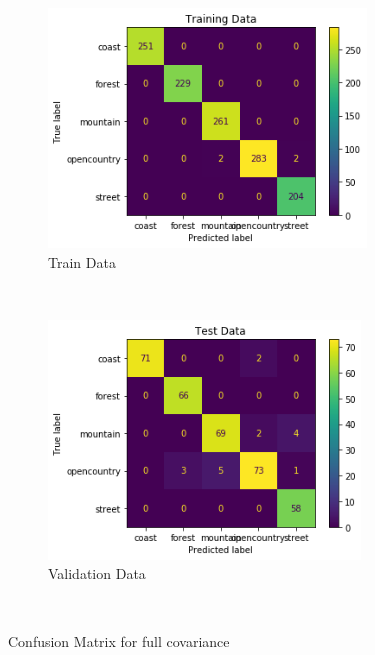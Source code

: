 \begin{figure}[!h]
    \centering
    \begin{subfigure}[t]{0.5\textwidth}
        \centering
        \includegraphics[height=2.5in]{Dataset_2b/full covariance train confusion matrix.png} 
        \caption{Train Data}
    \end{subfigure}%
    ~ 
    \begin{subfigure}[t]{0.5\textwidth}
        \centering
        \includegraphics[height=2.5in]{Dataset_2b/full covariance test confusion matrix.png}
        \caption{Validation Data}
    \end{subfigure}%
    ~
    \caption{Confusion Matrix for full covariance}
    \label{fig:31}
\end{figure}


